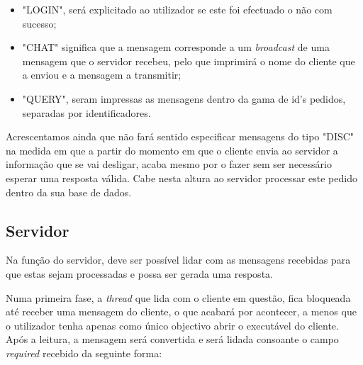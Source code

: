 \documentclass[a4paper]{article}
\begin{document}
\begin{itemize}
  \item "LOGIN", será explicitado ao utilizador se este foi efectuado o não com sucesso;
  \item "CHAT" significa que a mensagem corresponde a um \textit{broadcast} de uma mensagem que o servidor recebeu, pelo que imprimirá o nome do cliente que a enviou e a mensagem a transmitir;
  \item "QUERY", seram impressas as mensagens dentro da gama de id's pedidos, separadas por identificadores.
\end{itemize}

Acrescentamos ainda que não fará sentido especificar mensagens do tipo "DISC" na medida em que a partir do momento em que o cliente envia ao servidor a informação que se vai desligar, acaba mesmo por o fazer sem ser necessário esperar uma resposta válida. Cabe nesta altura ao servidor processar este pedido dentro da sua base de dados.

\subsection{Servidor}
Na função do servidor, deve ser possível lidar com as mensagens recebidas para que estas sejam processadas e possa ser gerada uma resposta.

Numa primeira fase, a \textit{thread} que lida com o cliente em questão, fica bloqueada até receber uma mensagem do cliente, o que acabará por acontecer, a menos que o utilizador tenha apenas como único objectivo abrir o executável do cliente.
Após a leitura, a mensagem será convertida e será lidada consoante o campo \textit{required} recebido da seguinte forma:
\end{document}
